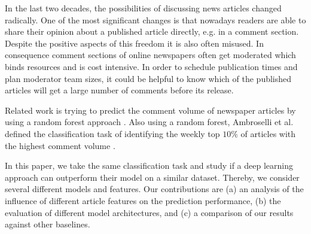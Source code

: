 In the last two decades, the possibilities of discussing news articles changed radically.
One of the most significant changes is that nowadays readers are able to share their opinion about a published article directly, e.g. in a comment section.
Despite the positive aspects of this freedom it is also often misused.
In consequence comment sections of online newspapers often get moderated which binds resources and is cost intensive.
In order to schedule publication times and plan moderator team sizes, it could be helpful to know which of the published articles will get a large number of comments before its release.

Related work is trying to predict the comment volume of newspaper articles by using a random forest approach \cite{tsagkias2009predicting}.
Also using a random forest, Ambroselli et al. defined the classification task of identifying the weekly top $10\%$ of articles with the highest comment volume \cite{ambroselli2018prediction}.

In this paper, we take the same classification task and study if a deep learning approach can outperform their model on a similar dataset.
Thereby, we consider several different models and features.
Our contributions are (a) an analysis of the influence of different article features on the prediction performance, (b) the evaluation of different model architectures, and (c) a comparison of our results against other baselines.
